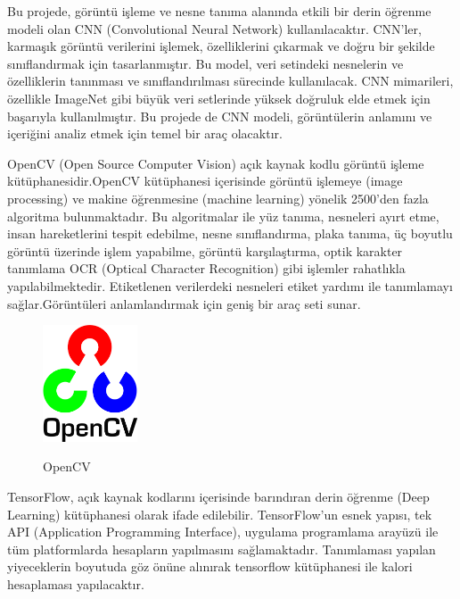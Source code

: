 \documentclass[11pt,a4paper]{report}
\begin{document}
\begin{enumerate}
\begin{figure}[!h]
    \end{figure}
    \newpage
    Bu projede, görüntü işleme ve nesne tanıma alanında etkili bir derin öğrenme modeli olan CNN (Convolutional Neural Network) kullanılacaktır. CNN'ler, karmaşık görüntü verilerini işlemek, özelliklerini çıkarmak ve doğru bir şekilde sınıflandırmak için tasarlanmıştır. Bu model, veri setindeki nesnelerin ve özelliklerin tanınması ve sınıflandırılması sürecinde kullanılacak. CNN mimarileri, özellikle ImageNet gibi büyük veri setlerinde yüksek doğruluk elde etmek için başarıyla kullanılmıştır. Bu projede de CNN modeli, görüntülerin anlamını ve içeriğini analiz etmek için temel bir araç olacaktır.
   \newline
    
    OpenCV (Open Source Computer Vision) açık kaynak kodlu görüntü işleme kütüphanesidir.OpenCV kütüphanesi içerisinde görüntü işlemeye (image processing) ve makine öğrenmesine (machine
    learning) yönelik 2500’den fazla algoritma bulunmaktadır. Bu algoritmalar ile yüz tanıma, nesneleri ayırt etme, insan hareketlerini tespit edebilme, nesne sınıflandırma, plaka tanıma, üç boyutlu görüntü üzerinde işlem yapabilme, görüntü karşılaştırma, optik karakter tanımlama OCR (Optical Character Recognition) gibi işlemler rahatlıkla yapılabilmektedir. Etiketlenen verilerdeki nesneleri etiket yardımı ile tanımlamayı sağlar.Görüntüleri anlamlandırmak için geniş bir araç seti sunar\cite{opencv}.
	\newline
	
	\begin{figure}[!h]
		\centering
		\includegraphics[width=0.25\textwidth]{OpenCV.png}
		\label{etiket}
		\caption{OpenCV}
		
	\end{figure}
    \newpage
     TensorFlow, açık kaynak kodlarını içerisinde barındıran derin öğrenme (Deep Learning) kütüphanesi olarak ifade edilebilir. TensorFlow’un esnek yapısı, tek API (Application Programming Interface), uygulama programlama arayüzü ile tüm platformlarda hesapların yapılmasını sağlamaktadır. Tanımlaması yapılan yiyeceklerin boyutuda göz önüne alınırak tensorflow kütüphanesi ile kalori hesaplaması yapılacaktır\cite{Tensorflow}.
     \newline
     

\end{enumerate}
\end{document}

